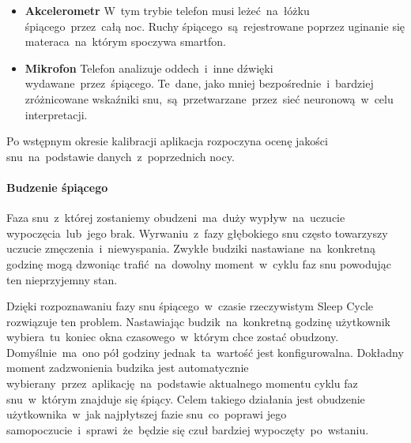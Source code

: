 \begin{itemize}
	\item {\bf Akcelerometr} W~tym trybie telefon musi leżeć~na~łóżku śpiącego~przez~całą noc. Ruchy śpiącego~są~rejestrowane poprzez uginanie się materaca~na~którym spoczywa smartfon. 
	\item {\bf Mikrofon} Telefon analizuje oddech~i~inne dźwięki wydawane~przez~śpiącego. Te~dane, jako mniej bezpośrednie~i~bardziej zróżnicowane wskaźniki snu,~są~przetwarzane~przez~sieć neuronową~w~celu interpretacji.
\end{itemize}

Po wstępnym okresie kalibracji aplikacja rozpoczyna ocenę jakości snu~na~podstawie danych~z~poprzednich nocy.

\bigskip
{}

\paragraph{Budzenie śpiącego}
Faza snu~z~której zostaniemy obudzeni~ma~duży wypływ~na~uczucie wypoczęcia~lub~jego brak. Wyrwaniu~z~fazy głębokiego snu często towarzyszy uczucie zmęczenia~i~niewyspania. Zwykłe budziki nastawiane~na~konkretną godzinę mogą dzwoniąc trafić~na~dowolny moment~w~cyklu faz snu powodując ten nieprzyjemny stan. 

Dzięki rozpoznawaniu fazy snu śpiącego~w~czasie rzeczywistym Sleep Cycle rozwiązuje ten problem. Nastawiając budzik~na~konkretną godzinę użytkownik wybiera~tu~koniec okna czasowego~w~którym chce zostać obudzony. Domyślnie~ma~ono pół godziny jednak~ta~wartość jest konfigurowalna. Dokładny moment zadzwonienia budzika jest automatycznie wybierany~przez~aplikację~na~podstawie aktualnego momentu cyklu faz snu~w~którym znajduje się śpiący. Celem takiego działania jest obudzenie użytkownika~w~jak najpłytszej fazie snu~co~poprawi jego samopoczucie~i~sprawi~że~będzie się czuł bardziej wypoczęty~po~wstaniu.
